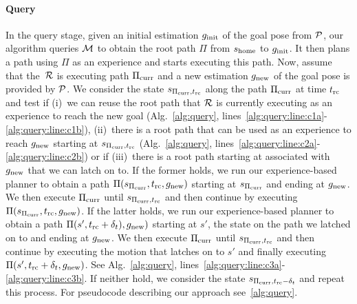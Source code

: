 \documentclass[a4paper,10pt]{article}
\begin{document}
\paragraph{Query}
In the query stage, given an initial estimation $g_{\rm init}$ of the goal pose from $\mathcal{P}$, our algorithm queries $\mathcal{M}$ to obtain the root path $\Pi$ from $s_{\textrm{home}}$ to $g_{\rm init}$.
It then plans a path using $\Pi$ as an experience and starts executing this path.
%
Now, assume that the~$\mathcal{R}$ is executing path $\Pi_{\rm curr}$ and a new estimation $g_{\rm new}$ of the goal pose is provided by $\mathcal{P}$.
%
We consider the state $s_{\Pi_{\rm curr}, t_{\textrm{rc}}}$ along the path $\Pi_{\rm curr}$ at time $t_{\textrm{rc}}$ and test if
(i)~we can reuse the root path that $\mathcal{R}$ is currently executing as an experience to reach the new goal
(Alg.~\ref{alg:query}, lines~\ref{alg:query:line:c1a}-\ref{alg:query:line:c1b}),
(ii)~there is a root path that can be used as an experience to reach $g_{\rm new}$ starting at $s_{\Pi_{\rm curr}, t_{\textrm{rc}}}$ 
(Alg.~\ref{alg:query}, lines~\ref{alg:query:line:c2a}-\ref{alg:query:line:c2b})
or if 
(iii)~there is a root path starting at \Shome associated with~$g_{\rm new}$ that we can latch on to.
If the former holds, we run our experience-based planner to obtain a path $\Pi(s_{\Pi_{\rm curr}}, t_{\textrm{rc}}, g_{\rm new})$ starting at $s_{\Pi_{\rm curr}}$ and ending at $g_{\rm new}$. We then execute $\Pi_{\rm curr}$ until $s_{\Pi_{\rm curr}, t_{\textrm{rc}}}$ and then continue by executing $\Pi(s_{\Pi_{\rm curr}}, t_{\textrm{rc}}, g_{\rm new})$.
%
If the latter holds, we run our experience-based planner to obtain a path $\Pi(s', t_{\textrm{rc}} + \delta_t), g_{\rm new})$ starting at $s'$, the state on the path we latched on to and ending at $g_{\rm new}$. We then execute $\Pi_{\rm curr}$ until $s_{\Pi_{\rm curr}, t_{\textrm{rc}}}$ and then continue by executing the motion that latches on to $s'$ and finally executing  $\Pi(s', t_{\textrm{rc}} + \delta_t, g_{\rm new})$.
See Alg.~\ref{alg:query}, lines~\ref{alg:query:line:c3a}-\ref{alg:query:line:c3b}.
%
If neither hold, we consider the state $s_{\Pi_{\rm curr}, t_{\textrm{rc}}-\delta_t}$ and repeat this process.
%
For pseudocode describing our approach see~\ref{alg:query}.
\end{document}
